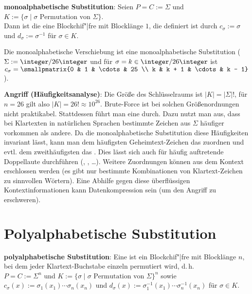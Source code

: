 \linie

\textbf{monoalphabetische Substitution}:
Seien $P = C := \Sigma$ und
$K := \{\sigma \;|\; \sigma \text{ Permutation von } \Sigma\}$.\\
Dann ist die  eine Blockchif"|fre mit Blocklänge $1$,
die definiert ist durch
$c_\sigma := \sigma$ und $d_\sigma := \sigma^{-1}$ für $\sigma \in K$.

Die monoalphabetische Verschiebung ist eine monoalphabetische Substitution
($\Sigma := \integer/26\integer$ und für $\sigma = k \in \integer/26\integer$ ist
$c_\sigma = \smallpmatrix{0 & 1 & \cdots & 25 \\ k & k + 1 & \cdots & k - 1}$).

\textbf{Angriff (Häufigkeitsanalyse)}:
Die Größe des Schlüsselraums ist $|K| = |\Sigma|!$, für $n = 26$ gilt also
$|K| = 26! \approx 10^{26}$.
Brute-Force ist bei solchen Größenordnungen nicht praktikabel.
Stattdessen führt man eine  durch.
Dazu nutzt man aus, dass bei Klartexten in natürlichen Sprachen bestimmte
Zeichen aus $\Sigma$ häufiger vorkommen als andere.
Da die monoalphabetische Substitution diese Häufigkeiten invariant lässt, kann man dem
häufigsten Geheimtext-Zeichen das  zuordnen und evtl. dem zweithäufigsten das .
Dies lässt sich auch für häufig auftretende Doppellaute durchführen (, , \dots).
Weitere Zuordnungen können aus dem Kontext erschlossen werden
(es gibt nur bestimmte Kombinationen von Klartext-Zeichen zu sinnvollen Wörtern).
Eine Abhilfe gegen diese überflüssigen Kontextinformationen kann Datenkompression sein
(um den Angriff zu erschweren).

\pagebreak

\section{%
    Polyalphabetische Substitution%
}

\textbf{polyalphabetische Substitution}:
Eine  ist ein Blockchif"|fre mit Blocklänge $n$,
bei dem jeder Klartext-Buchstabe einzeln permutiert wird, d.\,h.\\
$P = C := \Sigma^n$ und $K := \{\sigma \;|\; \sigma \text{ Permutation von } \Sigma\}^n$ sowie\\
$c_\sigma(x) := \sigma_1(x_1) \dotsb \sigma_n(x_n)$ und
$d_\sigma(x) := \sigma^{-1}_1(x_1) \dotsb \sigma^{-1}_n(x_n)$ für $\sigma \in K$.

